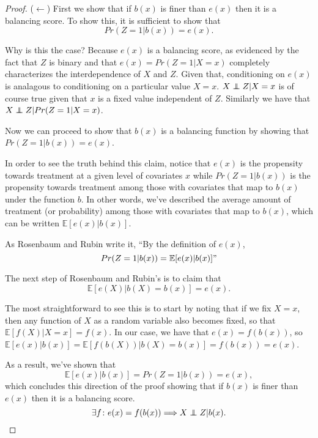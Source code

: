 \documentclass{article}
\newcommand\independent{\protect\mathpalette{\protect\independenT}{\perp}}
\def\independenT#1#2{\mathrel{\rlap{$#1#2$}\mkern2mu{#1#2}}}
\newcommand{\E}[0]{\mathbb E}
\begin{document}
\begin{proof}
    ($\leftarrow$) First we show that if $b(x)$ is finer than $e(x)$ then it is a balancing score. 
    To show this, it is sufficient to show that $$Pr(Z=1|b(x)) = e(x).$$

    Why is this the case?  Because $e(x)$ is a balancing score, as evidenced by the 
    fact that $Z$ is binary and that $e(x) = Pr(Z=1|X=x)$ completely characterizes the 
    interdependence of $X$ and $Z$.  Given that, conditioning on $e(x)$ is analagous 
    to conditioning on a particular value $X=x$. $X \independent Z \rvert X = x$ is
    of course true given that $x$ is a fixed value independent of $Z$. Similarly 
    we have that $X \independent Z \rvert Pr(Z = 1 | X = x)$. 

    Now we can proceed to show that $b(x)$ is a balancing function by showing that $Pr(Z = 1 | b(x)) = e(x)$. 

    In order to see the truth behind this claim, notice that $e(x)$ is the propensity towards treatment at a given level of covariates $x$ while $Pr(Z=1|b(x))$ is
    the propensity towards treatment among 
    those with covariates that map to $b(x)$ 
    under the function $b$. In other words, we've described the average amount of treatment (or probability) among those with covariates that map to $b(x)$, which can be written $\E[e(x)|b(x)]$. 

    As Rosenbaum and Rubin write it, ``By the definition of $e(x)$, 
    $$ Pr(Z=1|b(x)) = \E[e(x)|b(x)]"$$

    The next step of Rosenbaum and Rubin's is to 
    claim that 
    $$\E[e(X) | b(X) = b(x)] = e(x).$$

    The most straightforward to see this is to start
    by noting that if we fix $X=x$, then any function 
    of $X$ as a random variable also becomes fixed, so that $\E[f(X)|X=x] = f(x)$. In our case, we have that 
    $e(x) = f(b(x))$, so $\E[e(x)|b(x)] = \E[f(b(X))|b(X)=b(x)] = f(b(x)) = e(x)$. 

    As a result, we've shown that 
    $$\mathbb E[e(x)|b(x)] = Pr(Z = 1|b(x)) = e(x),$$
    which concludes this direction of the proof showing that if $b(x)$ is finer than $e(x)$ then it is a balancing score. 
    $$ \exists f \colon e(x) = f(b(x)) \Longrightarrow X \independent Z | b(x).$$


\end{proof}
\end{document}
